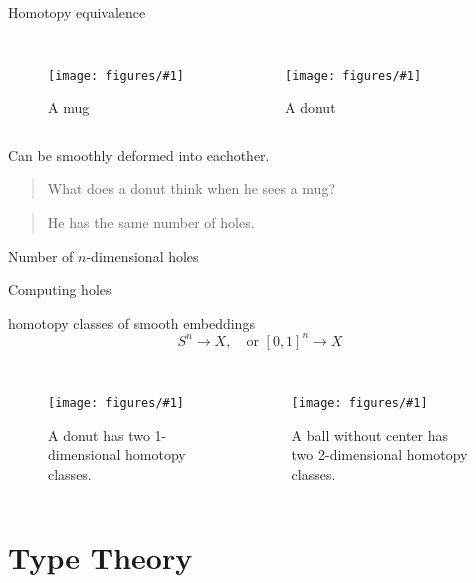 \documentclass[english]{beamer}
\newcommand{\fig}[2]{
    \begin{figure}\begin{center}\texttt{[image: figures/\#1]}\caption{#2\label{#1}}\end{center}
    \end{figure}}
\newcommand{\tcol}[2]{
    \begin{columns}
        \column{.5\textwidth}
        #1
        \column{.5\textwidth}
        #2
    \end{columns}
}
\begin{document}
\begin{frame}{Homotopy equivalence}


\begin{columns}
    \fig{mug}{A mug}
    \fig{donut.jpg}{A donut}
\end{columns}

\begin{definition}
 Can be smoothly deformed into eachother.
\end{definition}
\end{frame}

\begin{frame}{}
 
 \begin{quotation}
 What does a donut think when he sees a mug?
\end{quotation}

\pause

\begin{quotation}
He has the same number of holes.
\end{quotation}



\begin{definition}
 Number of \(n\)-dimensional holes 
 
\end{definition}
 
 
 
\end{frame}



\begin{frame}{Computing holes}

homotopy classes of smooth embeddings \[S^n \rightarrow X, \quad \text{or } {[0,1]}^n \rightarrow X\]

\tcol{
                \fig{loops}{A donut has two 1-dimensional homotopy classes.}
}
    {
                \fig{basketball_hollow}{A ball without center has two 2-dimensional homotopy classes.}
}

\end{frame}


\section{Type Theory}
\end{document}
